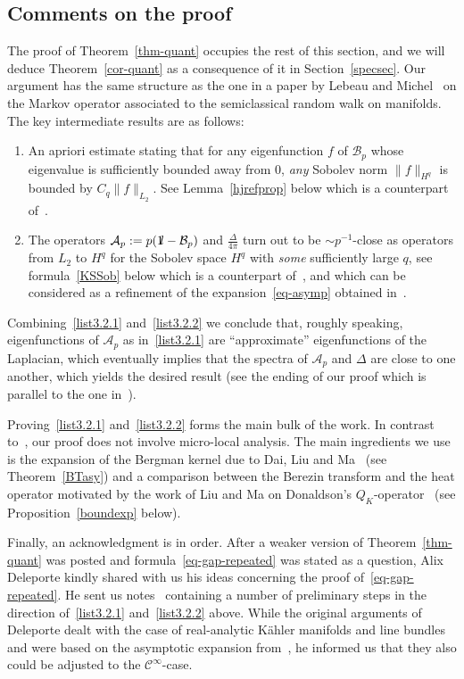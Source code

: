 \documentclass[11pt]{article}
\theoremstyle{definition}
\numberwithin{equation}{section}
\numberwithin{figure}{section}
\numberwithin{table}{section}
\newcommand{\cA}{{\mathcal{A}}}
\newcommand{\cB}{{\mathcal{B}}}
\newcommand*\id{{1\hskip-2.5pt{\rm l}}}
\newcommand\< {\mathcal{h}}
\renewcommand\> {\mathcal{i}}
\newcommand*\cC{\mathscr{C}}
\newcommand*{\romanenumi}{\renewcommand*{\theenumi}{\roman{enumi}}}
\begin{document}
\subsection{Comments on the proof}\label{subsec-comments}
The proof of Theorem~\ref{thm-quant} occupies the rest of this section, and we will deduce Theorem~\ref{cor-quant} as a consequence of it in Section~\ref{specsec}. Our argument has the same structure as the one in a paper by Lebeau and Michel~\cite{LM} on the Markov operator associated to the semiclassical random walk on manifolds. The key intermediate results are as follows:
\begin{enumerate}\romanenumi
\item \label{list3.2.1}An apriori estimate stating that for any eigenfunction $f$ of $\cB_p$ whose eigenvalue is sufficiently bounded away from $0$, \emph{any} Sobolev norm $\|f\|_{H^q}$ is bounded by $C_q \|f\|_{L_2}$. See Lemma~\ref{hjrefprop} below which is a counterpart of~\cite[Lemma~5]{LM}.
\item \label{list3.2.2}The operators $\cA_p:= p(\id-\cB_p)$ and $\frac{\Delta}{4\pi}$ turn out to be $\sim p^{-1}$-close as operators from $L_2$ to $H^q$ for the Sobolev space $H^q$ with \emph{some} sufficiently large $q$, see formula~\eqref{KSSob} below which is a counterpart of~\cite[formula (3.28)]{LM}, and which can be considered as a refinement of the expansion~\eqref{eq-asymp} obtained in~\cite{KS01}.
\end{enumerate}
Combining~\eqref{list3.2.1} and~\eqref{list3.2.2} we conclude that, roughly speaking, eigenfunctions of $\cA_p$ as in~\eqref{list3.2.1} are ``approximate'' eigenfunctions of the Laplacian, which eventually implies that the spectra of $\cA_p$ and $\Delta$ are close to one another, which yields the desired result (see the ending of our proof which is parallel to the one in~\cite{LM}).

Proving~\eqref{list3.2.1} and~\eqref{list3.2.2} forms the main bulk of the work. In contrast to~\cite{LM}, our proof does not involve micro-local analysis. The main ingredients we use is the expansion of the Bergman kernel due to Dai, Liu and Ma~\cite{DLM06} (see Theorem~\ref{BTasy}) and a comparison between the Berezin transform and the heat operator motivated by the work of Liu and Ma on Donaldson's $Q_K$-operator~\cite{LM07} (see Proposition~\ref{boundexp} below).

Finally, an acknowledgment is in order. After a weaker version of Theorem~\ref{thm-quant} was posted and formula~\eqref{eq-gap-repeated} was stated as a question, Alix Deleporte kindly shared with us his ideas concerning the proof of~\eqref{eq-gap-repeated}. He sent us notes~\cite{Deleporte} containing a number of preliminary steps in the direction of~\eqref{list3.2.1} and~\eqref{list3.2.2} above. While the original arguments of Deleporte dealt with the case of real-analytic K\"ahler manifolds and line bundles and were based on the asymptotic expansion from~\cite{Rouby, Deleporte}, he informed us that they also could be adjusted to the $\cC^\infty$-case.
\end{document}
